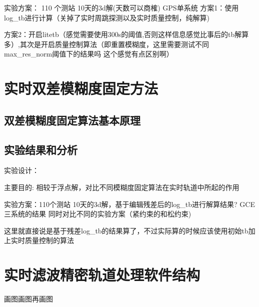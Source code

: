 实验方案： 110 个测站 10天的3d解(天数可以商榷) GPS单系统
方案1：使用log_tb进行计算（关掉了实时周跳探测以及实时质量控制，纯解算)

方案2：开启litetb（感觉需要使用300s的阈值,否则这样信息感觉比事后的tb解算多）,其次是开启质量控制算法（即重置模糊度，这里需要测试不同max_res_norm阈值下的结果吗 这个感觉有点区别啊）

\section{实时双差模糊度固定方法}

\subsection{双差模糊度固定算法基本原理}

\subsection{实验结果和分析}

实验设计：

主要目的:
相较于浮点解，对比不同模糊度固定算法在实时轨道中所起的作用

实验方案：110个测站  10天的3d解，基于编辑残差后的log_tb进行解算结果? GCE三系统的结果
同时对比不同的实验方案（紧约束的和松约束)

这里就直接说是基于残差log_tb的结果算了，不过实际算的时候应该使用初始tb加上实时质量控制的算法

\section{实时滤波精密轨道处理软件结构}

画图画图再画图
